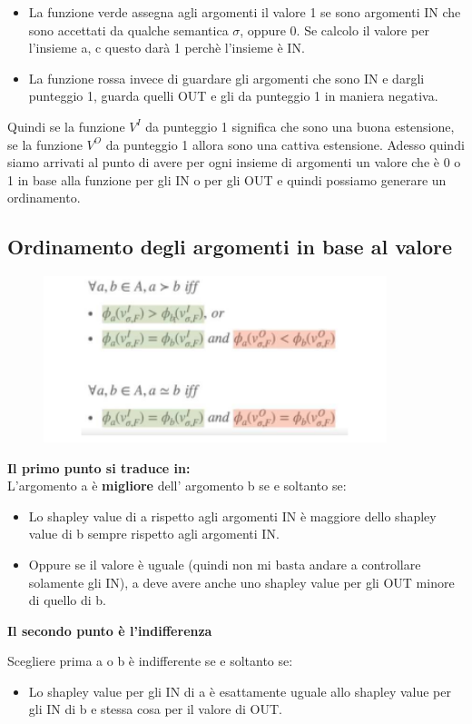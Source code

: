 \begin{itemize}
    \item La funzione verde assegna agli argomenti il valore 1 se sono argomenti IN che sono accettati da qualche semantica $\sigma$, oppure 0. Se calcolo il valore per l’insieme a, c questo darà 1 perchè l’insieme è IN.
    \item La funzione rossa invece di guardare gli argomenti che sono IN e dargli punteggio 1, guarda quelli OUT e gli da punteggio 1 in maniera negativa.
\end{itemize}
Quindi se la funzione $V^I$ da punteggio 1 significa che sono una buona estensione, se la funzione $V^O$ da punteggio 1 allora sono una cattiva estensione. Adesso quindi siamo arrivati al punto di avere per ogni insieme di argomenti un valore che è 0 o 1 in base alla funzione per gli IN o per gli OUT e quindi possiamo generare un ordinamento.
\subsection{Ordinamento degli argomenti in base al valore}
\begin{figure}[htp]
	\centering
    \includegraphics[width=10cm, keepaspectratio]{img/Cap8/ordinamento-valore.png}
\end{figure}
\textbf{Il primo punto si traduce in:}
\\L’argomento a è \textbf{migliore} dell’ argomento b se e soltanto se:
\begin{itemize}
    \item Lo shapley value di a rispetto agli argomenti IN è maggiore dello shapley value di b sempre rispetto agli argomenti IN.
    \item Oppure se il valore è uguale (quindi non mi basta andare a controllare solamente gli IN), a deve avere anche uno shapley value per gli OUT minore di quello di b.
\end{itemize}
\begin{center}
     \textbf{Il secondo punto è l’indifferenza}
\end{center}
 Scegliere prima a o b è indifferente se e soltanto se:
\begin{itemize}
    \item Lo shapley value per gli IN di a è esattamente uguale allo shapley value per gli IN di b e stessa cosa per il valore di OUT. 
\end{itemize}
